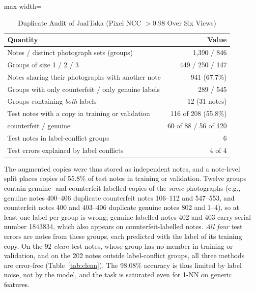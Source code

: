 \documentclass[journal]{IEEEtran}
\begin{document}
\begin{table}[!t]
\caption{Duplicate Audit of JaalTaka (Pixel NCC $>0.98$ Over Six Views)}
\label{tab:audit}
\centering
\footnotesize
\setlength{\tabcolsep}{4pt}
\begin{adjustbox}{max width=\columnwidth}
\begin{tabular}{@{}lr@{}}
\toprule
Quantity & Value \\
\midrule
Notes / distinct photograph sets (groups) & 1{,}390 / 846 \\
Groups of size 1 / 2 / 3 & 449 / 250 / 147 \\
Notes sharing their photographs with another note & 941 (67.7\%) \\
Groups with only counterfeit / only genuine labels & 289 / 545 \\
Groups containing \emph{both} labels & 12 (31 notes) \\
\midrule
Test notes with a copy in training or validation & 116 of 208 (55.8\%) \\
\quad counterfeit / genuine & 60 of 88 / 56 of 120 \\
Test notes in label-conflict groups & 6 \\
Test errors explained by label conflicts & 4 of 4 \\
\bottomrule
\end{tabular}
\end{adjustbox}
\end{table}

The augmented copies were thus stored as independent notes, and a note-level split
places copies of 55.8\% of test notes in training or validation. Twelve groups contain
genuine- and counterfeit-labelled copies of the \emph{same} photographs (e.g., genuine
notes 400--406 duplicate counterfeit notes 106--112 and 547--553, and counterfeit notes
400 and 403--406 duplicate genuine notes 802 and 1--4), so at least one label
per group is wrong; genuine-labelled notes 402 and 403 carry serial number 1843834,
which also appears on counterfeit-labelled notes. \emph{All four} test errors are notes
from these groups, each predicted with the label of its training copy. On the 92
\emph{clean} test notes, whose group has no member in training or validation, and on the
202 notes outside label-conflict groups, all three methods are error-free
(Table~\ref{tab:clean}). The 98.08\% accuracy is thus limited by label noise, not by the
model, and the task is saturated even for 1-NN on generic features.
\end{document}
